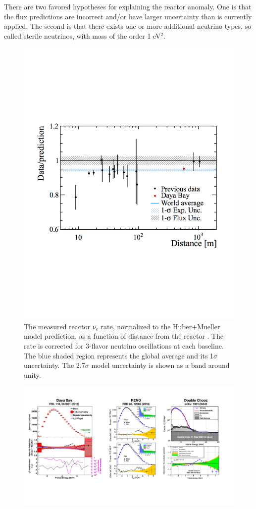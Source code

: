 There are two favored hypotheses for explaining the reactor anomaly. One is that the flux predictions are incorrect and/or have larger uncertainty than is currently applied. 
The second is that there exists one or more additional neutrino types, so called sterile neutrinos, with mass of the order 1 eV$^2$.


\begin{figure}[t]
	\centering
	\includegraphics[width=0.6\linewidth]{tex/3-reactorneutrinos-images/WorldAvgFlux}
	\caption[World average of reactor $\bar{\nu_{e}}$ flux. ]{The measured reactor $\bar{\nu_{e}}$ rate, normalized to the Huber+Mueller model prediction, as a function of distance from the reactor \cite{DayaBayFlux2018}. The rate is corrected for 3-flavor neutrino oscillations at each baseline. The blue shaded region represents the global average and its 1$\sigma$ uncertainty. The 2.7$\sigma$ model uncertainty is shown as a band around unity.}
	\label{fig:worldavgflux}
\end{figure}




\begin{figure}[h]
	\centering
	\includegraphics[width=1\linewidth]{tex/3-reactorneutrinos-images/Spectrums}
	\caption[Spectrums.]{\cite{DayaBayAnomaly,Seo:2016uom,DoubleChooz:2019qbj}}
	\label{fig:spectrums}
\end{figure}



